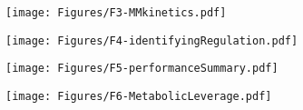 \documentclass[12pt]{article}\usepackage{graphicx, color}
\begin{document}
\newpage

\begin{figure}[h!]
\texttt{[image: Figures/F3-MMkinetics.pdf]}
\label{fig:TPI}
\end{figure}

\newpage

\begin{figure}[h!]
\texttt{[image: Figures/F4-identifyingRegulation.pdf]}
\label{fig:PYK}
\end{figure}

\newpage



\newpage


\begin{figure}[h!]
\texttt{[image: Figures/F5-performanceSummary.pdf]}
\label{fig:allosteryFit}
\end{figure}

\newpage

\begin{figure}[h!]
\begin{center}
\texttt{[image: Figures/F6-MetabolicLeverage.pdf]}
\label{fig:metabolicLeverage}
\end{center}
\end{figure}

\newpage
\cite{Fraenkel:2011wp}



\end{document}
